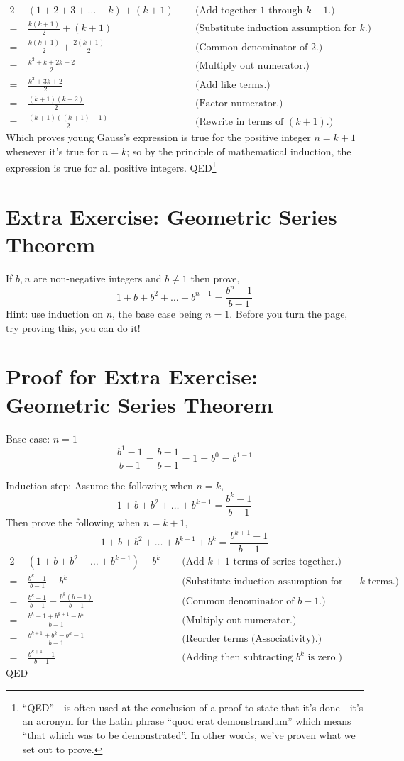 \documentclass{article}
\begin{document}
\begin{alignat*}{2}
&(1+2+3+\ldots+k) + (k+1) \;\;  &&\text{(Add together 1 through }k+1\text{.)}\\
=\ &\frac{k(k+1)}{2} + (k+1) &&\text{(Substitute induction assumption for 1 through }k\text{.)}\\
=\ &\frac{k(k+1)}{2} + \frac{2(k+1)}{2} &&\text{(Common denominator of 2.)}\\
=\ &\frac{k^2+k+2k+2}{2} &&\text{(Multiply out numerator.)}\\
=\ &\frac{k^2+3k+2}{2} &&\text{(Add like terms.)}\\
=\ &\frac{(k+1)(k+2)}{2} &&\text{(Factor numerator.)}\\
=\ &\frac{(k+1)((k+1)+1)}{2} &&\text{(Rewrite in terms of }(k+1)\text{.)}
\end{alignat*}
Which proves young Gauss's expression is true for
the positive integer $n = k+1$ whenever it's true for $n = k$; so
by the principle of mathematical induction,
the expression is true for all positive integers. QED\footnote{``QED'' - is
often used at the conclusion of a proof to state that it's
done - it's an acronym for the Latin phrase
``quod erat demonstrandum'' which means ``that which was to be demonstrated''.
In other words, we've proven what we set out to prove.}

\section*{Extra Exercise: Geometric Series Theorem}
If $b, n$ are non-negative integers and $b\ne1$ then prove,
\[1+b+b^2+\dots+b^{n-1} = \frac{b^n-1}{b-1}\]
Hint: use induction on $n$, the base case being $n=1$.  Before you turn the page, try proving this, you can do it!

\break
\section*{Proof for Extra Exercise: Geometric Series Theorem}
Base case: $n=1$
\[\frac{b^1-1}{b-1}=\frac{b-1}{b-1}=1=b^0=b^{1-1}\]

Induction step:
Assume the following when \(n = k\),
\[1+b+b^2+\dots+b^{k-1} = \frac{b^k-1}{b-1}\]
Then prove the following when \(n = k + 1\),
\[1+b+b^2+\dots+b^{k-1}+b^k = \frac{b^{k+1}-1}{b-1}\]
\begin{alignat*}{2}
&(1+b+b^2+\dots+b^{k-1}) + b^k  \;\;  &&\text{(Add }k+1\text{ terms of series together.)}\\
=\ &\frac{b^k-1}{b-1}+b^k &&\text{(Substitute induction assumption for first }k\text{ terms.)}\\
=\ &\frac{b^k-1}{b-1}+\frac{b^k(b-1)}{b-1}  &&\text{(Common denominator of }b-1\text{.)}\\
=\ &\frac{b^k-1+b^{k+1}-b^k}{b-1} &&\text{(Multiply out numerator.)}\\
=\ &\frac{b^{k+1}+b^k-b^k-1}{b-1} &&\text{(Reorder terms (Associativity).)}\\
=\ &\frac{b^{k+1}-1}{b-1} &&\text{(Adding then subtracting }b^k\text{ is zero.)}
\end{alignat*}
QED
\end{document}
